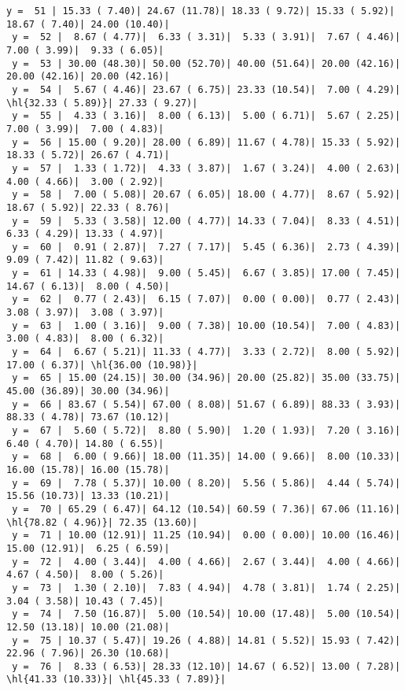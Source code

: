 \documentclass[10pt]{article}
\newcommand{\hl}[1]{\textcolor{blue}{#1}}
\begin{document}
\begin{Verbatim}[fontsize=\small, commandchars=\\\{\}]
 y =  51 | 15.33 ( 7.40)| 24.67 (11.78)| 18.33 ( 9.72)| 15.33 ( 5.92)| 18.67 ( 7.40)| 24.00 (10.40)|
 y =  52 |  8.67 ( 4.77)|  6.33 ( 3.31)|  5.33 ( 3.91)|  7.67 ( 4.46)|  7.00 ( 3.99)|  9.33 ( 6.05)|
 y =  53 | 30.00 (48.30)| 50.00 (52.70)| 40.00 (51.64)| 20.00 (42.16)| 20.00 (42.16)| 20.00 (42.16)|
 y =  54 |  5.67 ( 4.46)| 23.67 ( 6.75)| 23.33 (10.54)|  7.00 ( 4.29)| \hl{32.33 ( 5.89)}| 27.33 ( 9.27)|
 y =  55 |  4.33 ( 3.16)|  8.00 ( 6.13)|  5.00 ( 6.71)|  5.67 ( 2.25)|  7.00 ( 3.99)|  7.00 ( 4.83)|
 y =  56 | 15.00 ( 9.20)| 28.00 ( 6.89)| 11.67 ( 4.78)| 15.33 ( 5.92)| 18.33 ( 5.72)| 26.67 ( 4.71)|
 y =  57 |  1.33 ( 1.72)|  4.33 ( 3.87)|  1.67 ( 3.24)|  4.00 ( 2.63)|  4.00 ( 4.66)|  3.00 ( 2.92)|
 y =  58 |  7.00 ( 5.08)| 20.67 ( 6.05)| 18.00 ( 4.77)|  8.67 ( 5.92)| 18.67 ( 5.92)| 22.33 ( 8.76)|
 y =  59 |  5.33 ( 3.58)| 12.00 ( 4.77)| 14.33 ( 7.04)|  8.33 ( 4.51)|  6.33 ( 4.29)| 13.33 ( 4.97)|
 y =  60 |  0.91 ( 2.87)|  7.27 ( 7.17)|  5.45 ( 6.36)|  2.73 ( 4.39)|  9.09 ( 7.42)| 11.82 ( 9.63)|
 y =  61 | 14.33 ( 4.98)|  9.00 ( 5.45)|  6.67 ( 3.85)| 17.00 ( 7.45)| 14.67 ( 6.13)|  8.00 ( 4.50)|
 y =  62 |  0.77 ( 2.43)|  6.15 ( 7.07)|  0.00 ( 0.00)|  0.77 ( 2.43)|  3.08 ( 3.97)|  3.08 ( 3.97)|
 y =  63 |  1.00 ( 3.16)|  9.00 ( 7.38)| 10.00 (10.54)|  7.00 ( 4.83)|  3.00 ( 4.83)|  8.00 ( 6.32)|
 y =  64 |  6.67 ( 5.21)| 11.33 ( 4.77)|  3.33 ( 2.72)|  8.00 ( 5.92)| 17.00 ( 6.37)| \hl{36.00 (10.98)}|
 y =  65 | 15.00 (24.15)| 30.00 (34.96)| 20.00 (25.82)| 35.00 (33.75)| 45.00 (36.89)| 30.00 (34.96)|
 y =  66 | 83.67 ( 5.54)| 67.00 ( 8.08)| 51.67 ( 6.89)| 88.33 ( 3.93)| 88.33 ( 4.78)| 73.67 (10.12)|
 y =  67 |  5.60 ( 5.72)|  8.80 ( 5.90)|  1.20 ( 1.93)|  7.20 ( 3.16)|  6.40 ( 4.70)| 14.80 ( 6.55)|
 y =  68 |  6.00 ( 9.66)| 18.00 (11.35)| 14.00 ( 9.66)|  8.00 (10.33)| 16.00 (15.78)| 16.00 (15.78)|
 y =  69 |  7.78 ( 5.37)| 10.00 ( 8.20)|  5.56 ( 5.86)|  4.44 ( 5.74)| 15.56 (10.73)| 13.33 (10.21)|
 y =  70 | 65.29 ( 6.47)| 64.12 (10.54)| 60.59 ( 7.36)| 67.06 (11.16)| \hl{78.82 ( 4.96)}| 72.35 (13.60)|
 y =  71 | 10.00 (12.91)| 11.25 (10.94)|  0.00 ( 0.00)| 10.00 (16.46)| 15.00 (12.91)|  6.25 ( 6.59)|
 y =  72 |  4.00 ( 3.44)|  4.00 ( 4.66)|  2.67 ( 3.44)|  4.00 ( 4.66)|  4.67 ( 4.50)|  8.00 ( 5.26)|
 y =  73 |  1.30 ( 2.10)|  7.83 ( 4.94)|  4.78 ( 3.81)|  1.74 ( 2.25)|  3.04 ( 3.58)| 10.43 ( 7.45)|
 y =  74 |  7.50 (16.87)|  5.00 (10.54)| 10.00 (17.48)|  5.00 (10.54)| 12.50 (13.18)| 10.00 (21.08)|
 y =  75 | 10.37 ( 5.47)| 19.26 ( 4.88)| 14.81 ( 5.52)| 15.93 ( 7.42)| 22.96 ( 7.96)| 26.30 (10.68)|
 y =  76 |  8.33 ( 6.53)| 28.33 (12.10)| 14.67 ( 6.52)| 13.00 ( 7.28)| \hl{41.33 (10.33)}| \hl{45.33 ( 7.89)}|

\end{Verbatim}
\end{document}
